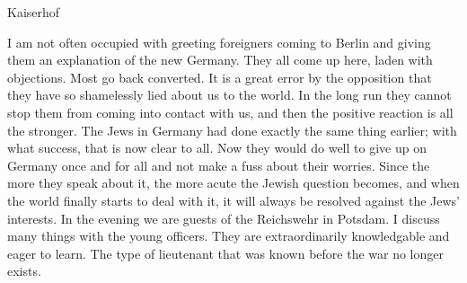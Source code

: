 Kaiserhof

I am not often occupied with greeting foreigners coming to Berlin and giving them an explanation of the new Germany. They all come up here, laden with objections. Most go back converted. It is a great error by the opposition that they have so shamelessly lied about us to the world. In the long run they cannot stop them from coming into contact with us, and then the positive reaction is all the stronger. The Jews in Germany had done exactly the same thing earlier; with what success, that is now clear to all. Now they would do well to give up on Germany once and for all and not make a fuss about their worries. Since the more they speak about it, the more acute the Jewish question becomes, and when the world finally starts to deal with it, it will always be resolved against the Jews' interests. In the evening we are guests of the Reichswehr in Potsdam. I discuss many things with the young officers. They are extraordinarily knowledgable and eager to learn. The type of lieutenant that was known before the war no longer exists.